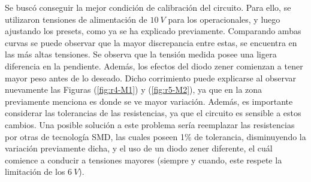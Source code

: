 Se buscó conseguir la mejor condición de calibración del circuito. Para ello, se utilizaron tensiones de alimentación de $10 \ V$ para los operacionales, y luego ajustando los presets, como ya se ha explicado previamente. Comparando ambas curvas se puede observar que la mayor discrepancia entre estas, se encuentra en las más altas tensiones. Se observa que la tensión medida posee una ligera diferencia en la pendiente. Además, los efectos del diodo zener comienzan a tener mayor peso antes de lo deseado. Dicho corrimiento puede explicarse al observar nuevamente las Figuras (\ref{fig:r4-M1}) y (\ref{fig:r5-M2}), ya que en la zona previamente menciona es donde se ve mayor variación. Además, es importante considerar las tolerancias de las resistencias, ya que el circuito es sensible a estos cambios. Una posible solución a este problema sería reemplazar las resistencias por otras de tecnología SMD, las cuales poseen 1\% de tolerancia, disminuyendo la variación previamente dicha, y el uso de un diodo zener diferente, el cuál comience a conducir a tensiones mayores (siempre y cuando, este respete la limitación de los $6 \ V$).